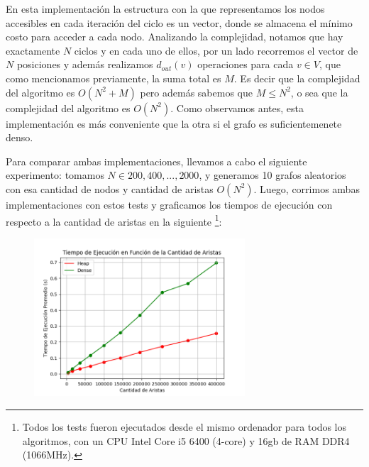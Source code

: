 

En esta implementación la estructura con la que representamos los nodos accesibles en cada iteración del ciclo es un vector, donde se almacena el mínimo costo para acceder a cada nodo. 
Analizando la complejidad, notamos que hay exactamente $N$ ciclos y en cada uno de ellos, por un lado recorremos el vector de $N$ posiciones y además realizamos $d_{out}(v)$ operaciones para cada $v \in V$, que como mencionamos previamente, la suma total es $M$. Es decir que la complejidad del algoritmo es $O(N^2 + M)$ pero además sabemos que $M \leq N^2$, o sea que la complejidad del algoritmo es $O(N^2)$.
Como observamos antes, esta implementación es más conveniente que la otra si el grafo es suficientemenete denso.

Para comparar ambas implementaciones, llevamos a cabo el siguiente experimento: tomamos $N \in {200, 400,...,2000}$, y generamos 10 grafos aleatorios con esa cantidad de nodos y cantidad de aristas $O(N^2)$. Luego, corrimos ambas implementaciones con estos tests y graficamos los tiempos de ejecución con respecto a la cantidad de aristas en la siguiente \footnote{Todos los tests fueron ejecutados desde el mismo ordenador para todos los algoritmos, con un CPU Intel Core i5 6400 (4-core) y 16gb de RAM DDR4 (1066MHz).}:

\begin{figure}[h]
    \centering
    \includegraphics[width=0.7\textwidth, trim=0 0 0 10]{./grafico.png}
    \label{grafico}
\end{figure}

